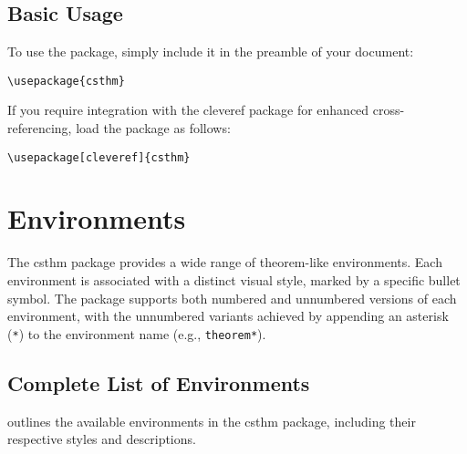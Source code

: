 \documentclass{amsart}
\newcommand{\pkg}[1]{\textsf{#1}}
\begin{document}
\subsection{Basic Usage}

To use the package, simply include it in the preamble of your document:
\begin{verbatim}
\usepackage{csthm}
\end{verbatim}

If you require integration with the \pkg{cleveref} package for enhanced cross-referencing, load the package as follows:
\begin{verbatim}
\usepackage[cleveref]{csthm}
\end{verbatim}

\section{Environments}

The \pkg{csthm} package provides a wide range of theorem-like environments. Each environment is associated with a distinct visual style, marked by a specific bullet symbol. The package supports both numbered and unnumbered versions of each environment, with the unnumbered variants achieved by appending an asterisk (\texttt{*}) to the environment name (e.g., \texttt{theorem*}).

\subsection{Complete List of Environments}

 outlines the available environments in the \pkg{csthm} package, including their respective styles and descriptions.
\end{document}

